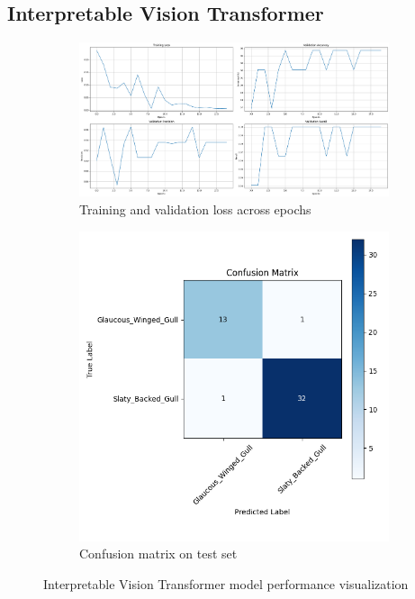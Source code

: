 \documentclass[a4paper,12pt]{report}
\begin{document}
\subsection{Interpretable Vision Transformer}
\begin{figure}[H]
    \centering
    \begin{subfigure}[b]{0.48\textwidth}
        \centering
        \includegraphics[width=\textwidth]{images/appendix/modelgraph/interpretablevit/interpretablevit.png}
        \caption{Training and validation loss across epochs}
        \label{fig:interpretablevit_training}
    \end{subfigure}
    \hfill
    \begin{subfigure}[b]{0.48\textwidth}
        \centering
        \includegraphics[width=\textwidth]{images/appendix/modelgraph/interpretablevit/confusion_matrix.png}
        \caption{Confusion matrix on test set}
        \label{fig:interpretablevit_confusion}
    \end{subfigure}
    \caption{Interpretable Vision Transformer model performance visualization}
    \label{fig:interpretablevit_performance}
\end{figure}
\end{document}
